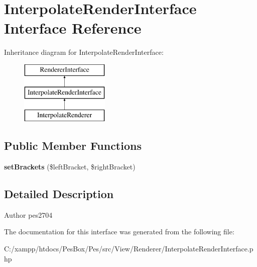 \hypertarget{interface_pes_1_1_view_1_1_renderer_1_1_interpolate_render_interface}{}\section{Interpolate\+Render\+Interface Interface Reference}
\label{interface_pes_1_1_view_1_1_renderer_1_1_interpolate_render_interface}
Inheritance diagram for Interpolate\+Render\+Interface\+:\begin{figure}[H]
\begin{center}
\leavevmode
\includegraphics[height=3.000000cm]{interface_pes_1_1_view_1_1_renderer_1_1_interpolate_render_interface}
\end{center}
\end{figure}
\subsection*{Public Member Functions}
\begin{DoxyCompactItemize}
\item 
\mbox{\label{interface_pes_1_1_view_1_1_renderer_1_1_interpolate_render_interface_a6094454146e333e5e858c6dce3297c11}} 
{\bfseries set\+Brackets} (\$left\+Bracket, \$right\+Bracket)
\end{DoxyCompactItemize}


\subsection{Detailed Description}
\begin{DoxyAuthor}{Author}
pes2704 
\end{DoxyAuthor}


The documentation for this interface was generated from the following file\+:\begin{DoxyCompactItemize}
\item 
C\+:/xampp/htdocs/\+Pes\+Box/\+Pes/src/\+View/\+Renderer/Interpolate\+Render\+Interface.\+php\end{DoxyCompactItemize}
